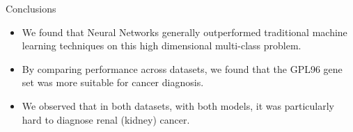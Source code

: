 \documentclass{beamer}
\begin{document}
    \begin{frame}{Conclusions}
        \begin{itemize} \setlength\itemsep{15pt}
            \item {
                We found that Neural Networks generally outperformed traditional
                machine learning techniques on this high dimensional multi-class
                problem.
            }
            \item {
                By comparing performance across datasets, we found that the GPL96
                gene set was more suitable for cancer diagnosis.
            }
            \item {
                We observed that in both datasets, with both models, it was
                particularly hard to diagnose renal (kidney) cancer.
            }
        \end{itemize}
    \end{frame}
\end{document}
